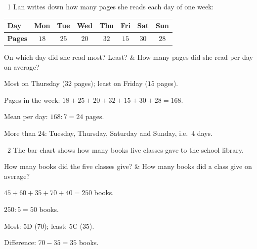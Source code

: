 \begin{exbox}{\ExWord\ 1}
Lan writes down how many pages she reads each day of one week:
\begin{center}
\begin{tabular}{|l|c|c|c|c|c|c|c|}
\hline
\textbf{Day} & Mon & Tue & Wed & Thu & Fri & Sat & Sun\\\hline
\textbf{Pages} & $18$ & $25$ & $20$ & $32$ & $15$ & $30$ & $28$\\\hline
\end{tabular}
\end{center}
\begin{cols2}
 On which day did she read most? Least? &  How many pages did she read per day on average?\\
\end{cols2}
\guide
{} Most on Thursday ($32$ pages); least on Friday ($15$ pages).\par
{} Pages in the week: $18+25+20+32+15+30+28=168$.\par Mean per day: $168:7=24$ pages.\par
{} More than $24$: Tuesday, Thursday, Saturday and Sunday, i.e.\ $4$ days.
\end{exbox}
\gap
\begin{exbox}{\ExWord\ 2}
The bar chart shows how many books five classes gave to the school library.
\begin{center}
\end{center}
\begin{cols2}
 How many books did the five classes give? &  How many books did a class give on average?\\
\end{cols2}
\guide
{} $45+60+35+70+40=250$ books.\par
{} $250:5=50$ books.\par
{} Most: 5D ($70$); least: 5C ($35$).\par Difference: $70-35=35$ books.
\end{exbox}
\gap
